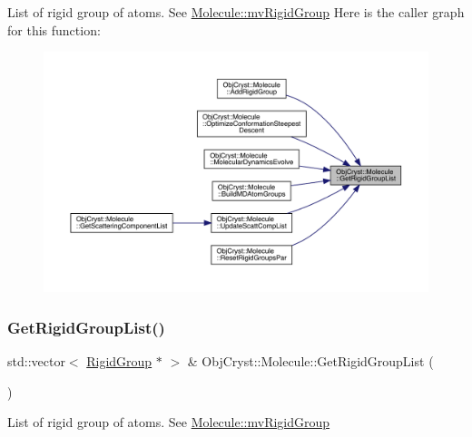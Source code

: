 List of rigid group of atoms. See \mbox{\hyperlink{class_obj_cryst_1_1_molecule_a43939b3e3ad83065cf7ccb6065a53a12}{Molecule\+::mv\+Rigid\+Group}} Here is the caller graph for this function\+:
\nopagebreak
\begin{figure}[H]
\begin{center}
\leavevmode
\includegraphics[width=350pt]{class_obj_cryst_1_1_molecule_a58771b4ff0139164760b7310ee2e1837_icgraph}
\end{center}
\end{figure}
\mbox{\label{class_obj_cryst_1_1_molecule_a62718d99f36f75a66b043b78ef4f5dbf}} 
\subsubsection{\texorpdfstring{GetRigidGroupList()}{GetRigidGroupList()}\hspace{0.1cm}{\footnotesize\ttfamily [2/2]}}
{\footnotesize\ttfamily std\+::vector$<$ \mbox{\hyperlink{class_obj_cryst_1_1_rigid_group}{Rigid\+Group}} $\ast$ $>$ \& Obj\+Cryst\+::\+Molecule\+::\+Get\+Rigid\+Group\+List (\begin{DoxyParamCaption}{ }\end{DoxyParamCaption})}

List of rigid group of atoms. See \mbox{\hyperlink{class_obj_cryst_1_1_molecule_a43939b3e3ad83065cf7ccb6065a53a12}{Molecule\+::mv\+Rigid\+Group}} \mbox{\label{class_obj_cryst_1_1_molecule_a03f7f32ade8523f118cab14a21a87843}} 
